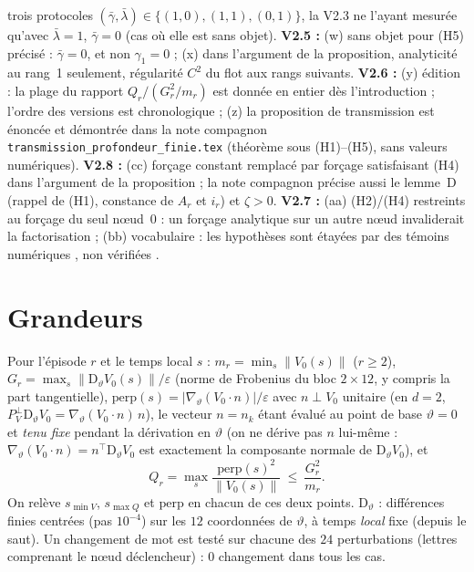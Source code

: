 \documentclass[11pt,a4paper]{article}
\theoremstyle{remark}
\newcommand{\norm}[1]{\lVert #1\rVert}
\newcommand{\vth}{\vartheta}
\newcommand{\D}{\mathrm D}
\begin{document}
trois protocoles $(\bar\gamma,\bar\lambda)\in\{(1,0),(1,1),(0,1)\}$, la V2.3 ne l'ayant mesur\'ee qu'avec $\bar\lambda=1$, $\bar\gamma=0$ (cas o\`u elle est sans objet). \textbf{V2.5 :} (w) \og sans objet \fg{} pour (H5) pr\'ecis\'e : $\bar\gamma=0$, et non $\gamma_1=0$ ; (x) dans l'argument de la proposition, analyticit\'e au rang~1 seulement, r\'egularit\'e $C^2$ du flot aux rangs suivants. \textbf{V2.6 :} (y) \'edition : la plage du rapport $Q_r/(G_r^2/m_r)$ est donn\'ee en entier d\`es l'introduction ; l'ordre des versions est chronologique ; (z) la proposition de transmission est \'enonc\'ee et d\'emontr\'ee dans la note compagnon \texttt{transmission\_profondeur\_finie.tex} (th\'eor\`eme sous (H1)--(H5), sans valeurs num\'eriques). \textbf{V2.8 :} (cc) \og for\c{c}age constant \fg{} remplac\'e par \og for\c{c}age satisfaisant (H4) \fg{} dans l'argument de la proposition ; la note compagnon pr\'ecise aussi le lemme~D (rappel de (H1), constance de $A_r$ et $i_r$) et $\zeta>0$. \textbf{V2.7 :} (aa) (H2)/(H4) restreints au for\c{c}age du seul n\oe ud~0 : un for\c{c}age analytique sur un autre n\oe ud invaliderait la factorisation ; (bb) vocabulaire : les hypoth\`eses sont \og \'etay\'ees par des t\'emoins num\'eriques \fg{}, non \og v\'erifi\'ees \fg.

\section{Grandeurs}
Pour l'\'episode $r$ et le temps local $s$ : $m_r=\min_s\norm{V_0(s)}$ ($r\ge2$), $G_r=\max_s\norm{\D_\vth V_0(s)}/\varepsilon$ (norme de Frobenius du bloc $2\times12$, y compris la part tangentielle), $\mathrm{perp}(s)=\lvert\nabla_\vth(V_0\!\cdot n)\rvert/\varepsilon$ avec $n\perp V_0$ unitaire (en $d=2$, $P^\perp_V\D_\vth V_0=\nabla_\vth(V_0\!\cdot n)\,n$), le vecteur $n=n_k$ \'etant \'evalu\'e au point de base $\vth=0$ et \emph{tenu fixe} pendant la d\'erivation en $\vth$ (on ne d\'erive pas $n$ lui-m\^eme : $\nabla_\vth(V_0\!\cdot n)=n^\top\D_\vth V_0$ est exactement la composante normale de $\D_\vth V_0$), et
\[
Q_r=\max_s\frac{\mathrm{perp}(s)^2}{\norm{V_0(s)}}\ \le\ \frac{G_r^2}{m_r}.
\]
On relève $s_{\min V}$, $s_{\max Q}$ et $\mathrm{perp}$ en chacun de ces deux points. $\D_\vth$ : diff\'erences finies centr\'ees (pas $10^{-4}$) sur les $12$ coordonn\'ees de $\vth$, \`a temps \emph{local} fixe (depuis le saut). Un changement de mot est test\'e sur chacune des $24$ perturbations (lettres comprenant le n\oe ud d\'eclencheur) : $0$ changement dans tous les cas.
\end{document}
